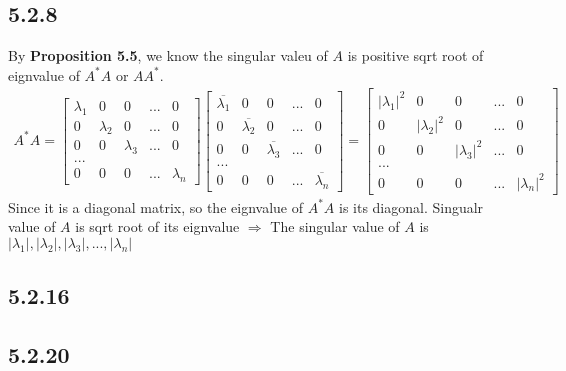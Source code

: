 \documentclass{article}
\begin{document}
\subsection*{5.2.8}
By \textbf{Proposition 5.5}, we know the singular valeu of $A$ is positive sqrt root of eignvalue of $A^*A$ or $AA^*$.
\begin{equation*}
    \begin{split}
        A^*A = \begin{bmatrix}
            \lambda_1 & 0 & 0 & ... & 0 \\
            0 & \lambda_2 & 0 & ... & 0 \\
            0 & 0 & \lambda_3 & ... & 0 \\
            ...\\
            0 & 0 & 0 & ... & \lambda_n 
        \end{bmatrix} \begin{bmatrix}
            \overline{\lambda_1} & 0 & 0 & ... & 0 \\
            0 & \overline{\lambda_2} & 0 & ... & 0 \\
            0 & 0 & \overline{\lambda_3} & ... & 0 \\
            ...\\
            0 & 0 & 0 & ... & \overline{\lambda_n}
        \end{bmatrix} = \begin{bmatrix}
            |\lambda_1|^2 & 0 & 0 & ... & 0 \\
            0 & |\lambda_2|^2 & 0 & ... & 0 \\
            0 & 0 & |\lambda_3|^2 & ... & 0 \\
            ...\\
            0 & 0 & 0 & ... & |\lambda_n|^2
        \end{bmatrix}
    \end{split}
\end{equation*}
Since it is a diagonal matrix, so the eignvalue of $A^*A$ is its diagonal. Singualr value of $A$ is sqrt root of its eignvalue $\Rightarrow$
The singular value of $A$ is $|\lambda_1|, |\lambda_2|, |\lambda_3|, ..., |\lambda_n|$



\subsection*{5.2.16}

\subsection*{5.2.20}
\end{document}
